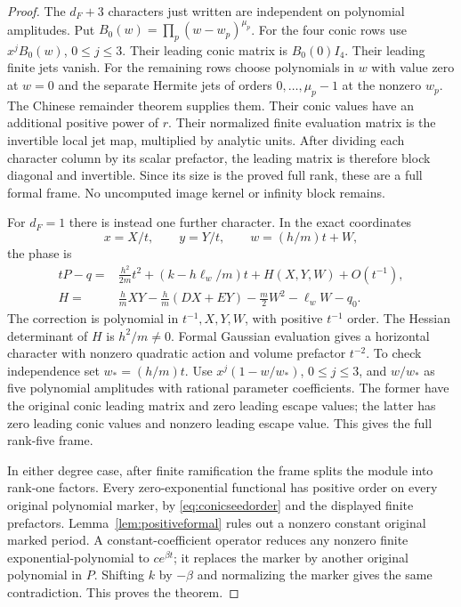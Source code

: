 \begin{proof}
The $d_F+3$ characters just written are independent on polynomial
amplitudes. Put $B_0(w)=\prod_p(w-w_p)^{\mu_p}$. For the four
conic rows use $x^jB_0(w)$, $0\le j\le3$. Their leading
conic matrix is $B_0(0)I_4$. Their leading finite jets vanish.
For the remaining rows choose polynomials in $w$ with value zero
at $w=0$ and the separate Hermite jets of orders
$0,\ldots,\mu_p-1$ at the nonzero $w_p$. The Chinese remainder
theorem supplies them. Their conic values have an additional
positive power of $r$. Their normalized finite evaluation matrix
is the invertible local jet map, multiplied by analytic units.
After dividing each character column by its scalar prefactor,
the leading matrix is therefore block diagonal and invertible.
Since its size is the proved full rank, these are a full formal
frame. No uncomputed image kernel or infinity block remains.

For $d_F=1$ there is instead one further character. In the exact
coordinates
\[
 x=X/t,\qquad y=Y/t,\qquad w=(h/m)t+W,
\]
the phase is
\begin{align*}
 tP-q={}&\frac{h^2}{2m}t^2+(k-h\ell_w/m)t+H(X,Y,W)+O(t^{-1}),\\
 H={}&\frac hm XY-\frac hm(DX+EY)-\frac m2 W^2-\ell_w W-q_0.
\end{align*}
The correction is polynomial in $t^{-1},X,Y,W$, with positive
$t^{-1}$ order. The Hessian determinant of $H$ is $h^2/m\ne0$.
Formal Gaussian evaluation gives a horizontal character with
nonzero quadratic action and volume prefactor $t^{-2}$.
To check independence set $w_*=(h/m)t$. Use
$x^j(1-w/w_*)$, $0\le j\le3$, and $w/w_*$ as five polynomial
amplitudes with rational parameter coefficients. The former
have the original conic leading matrix and zero leading escape
values; the latter has zero leading conic values and nonzero
leading escape value. This gives the full rank-five frame.

In either degree case, after finite ramification the frame splits
the module into rank-one factors. Every zero-exponential
functional has positive order on every original polynomial
marker, by \eqref{eq:conicseedorder} and the displayed finite
prefactors. Lemma~\ref{lem:positiveformal} rules out a nonzero
constant original marked period. A constant-coefficient operator
reduces any nonzero finite exponential-polynomial to $c e^{\beta t}$;
it replaces the marker by another original polynomial in $P$.
Shifting $k$ by $-\beta$ and normalizing the marker gives the same
contradiction. This proves the theorem.
\end{proof}

